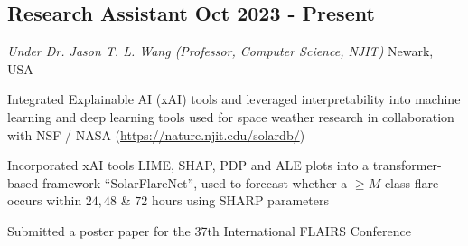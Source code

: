 \subsection{{Research Assistant \hfill  Oct 2023 - Present}}
{\textit{Under Dr. Jason T. L. Wang (Professor, Computer Science, NJIT)} \hfill Newark, USA}
\begin{zitemize}
\item {Integrated Explainable AI (xAI) tools and leveraged interpretability into machine learning and deep learning tools used for 
space weather research in collaboration with NSF / NASA (\url{https://nature.njit.edu/solardb/})}
\item {Incorporated xAI tools LIME, SHAP, PDP and ALE plots into a transformer-based framework ``SolarFlareNet'', used to forecast whether a $\geq M$-class 
flare occurs within $24, 48$ \& $72$ hours using SHARP parameters}
\item {Submitted a poster paper for the 37th International FLAIRS Conference}
\end{zitemize}


